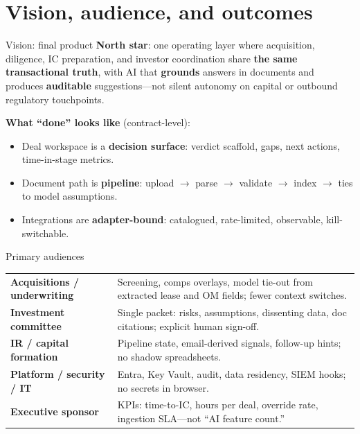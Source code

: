 \documentclass[aspectratio=169,11pt]{beamer}
\begin{document}
\section{Vision, audience, and outcomes}

\begin{frame}{Vision: final product}
  \small
  \textbf{North star}: one operating layer where acquisition, diligence, IC preparation, and investor coordination share \textbf{the same transactional truth}, with AI that \textbf{grounds} answers in documents and produces \textbf{auditable} suggestions---not silent autonomy on capital or outbound regulatory touchpoints.

  \vspace{0.6em}
  \textbf{What ``done'' looks like} (contract-level):
  \begin{itemize}\itemsep2pt
    \item Deal workspace is a \textbf{decision surface}: verdict scaffold, gaps, next actions, time-in-stage metrics.
    \item Document path is \textbf{pipeline}: upload $\rightarrow$ parse $\rightarrow$ validate $\rightarrow$ index $\rightarrow$ ties to model assumptions.
    \item Integrations are \textbf{adapter-bound}: catalogued, rate-limited, observable, kill-switchable.
  \end{itemize}
\end{frame}

\begin{frame}{Primary audiences}
  \small
  \begin{tabular}{p{3.2cm}p{9.5cm}}
    \textbf{Acquisitions / underwriting} & Screening, comps overlays, model tie-out from extracted lease and OM fields; fewer context switches. \\
    \textbf{Investment committee} & Single packet: risks, assumptions, dissenting data, doc citations; explicit human sign-off. \\
    \textbf{IR / capital formation} & Pipeline state, email-derived signals, follow-up hints; no shadow spreadsheets. \\
    \textbf{Platform / security / IT} & Entra, Key Vault, audit, data residency, SIEM hooks; no secrets in browser. \\
    \textbf{Executive sponsor} & KPIs: time-to-IC, hours per deal, override rate, ingestion SLA---not ``AI feature count.'' \\
  \end{tabular}
\end{frame}
\end{document}
